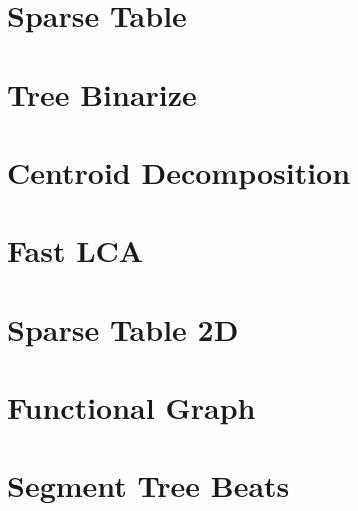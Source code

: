 \section{Sparse Table}
\section{Tree Binarize}
\section{Centroid Decomposition}
\section{Fast LCA}
\section{Sparse Table 2D}
\section{Functional Graph}
\section{Segment Tree Beats}
